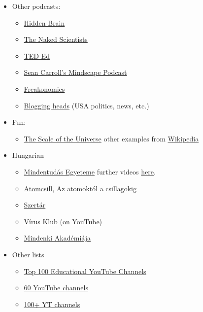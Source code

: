 \documentclass{article}
\begin{document}
\begin{itemize}
    \item Other podcasts:
    \begin{itemize}
    \item \href{https://www.npr.org/series/423302056/hidden-brain}{Hidden Brain}
    \item \href{https://www.thenakedscientists.com/}{The Naked Scientists}
    \item \href{https://ed.ted.com/}{TED Ed}
    \item \href{https://www.preposterousuniverse.com/podcast/}{Sean Carroll's Mindscape Podcast}
    \item \href{https://freakonomics.com/}{Freakonomics}
    \item \href{https://bloggingheads.tv/}{Blogging heads} (USA politics, news, etc.)
    \end{itemize}
    
    \item Fun:
    \begin{itemize}
        \item \href{http://htwins.net/scale2/}{The Scale of the Universe} other examples from \href{https://en.wikipedia.org/wiki/Orders_of_magnitude_(length)}{Wikipedia}
    \end{itemize}
    
    \item Hungarian
    \begin{itemize}
        \item \href{https://mindentudas.hu/}{Mindentudás Egyeteme} further videos \href{https://mindentudas.videotorium.hu/hu/channels/1132/mindentudas-egyeteme}{here}.
        \item \href{http://www.atomcsill.elte.hu/}{Atomcsill}, Az atomoktól a csillagokig
        \item \href{https://open.spotify.com/show/1jWHOglcRsGZEFbNZ1TwNO}{Szertár}
        \item \href{https://www.virusklub.hu/}{Vírus Klub} (on \href{https://www.youtube.com/@kolorVIRUSKLUB}{YouTube})
        \item \href{https://mediaklikk.hu/musor/mindenki-akademiaja/}{Mindenki Akadémiája}
    \end{itemize}

\item Other lists
\begin{itemize}
    \item \href{https://blog.feedspot.com/educational_youtube_channels/}{Top 100 Educational YouTube Channels}
    \item \href{https://medium.com/the-graph/60-youtube-channels-that-will-make-you-smarter-44d8315c2548}{60 YouTube channels}
    \item \href{https://collegeinfogeek.com/educational-youtube-channels/}{100+ YT channels}
\end{itemize}

\end{itemize}
\end{document}
